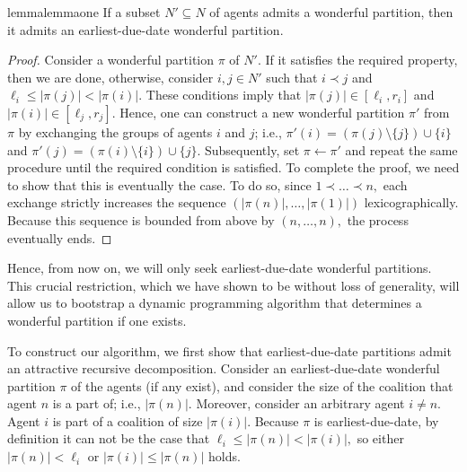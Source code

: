 \documentclass[a4paper,UKenglish,cleveref, autoref, thm-restate]{lipics-v2021}
\newcommand{\set}[1]{\{#1\}}
\newcommand{\modulus}[1]{\vert #1 \vert}
\begin{document}
\begin{restatable}{lemma}{lemmaone} If a subset $N' \subseteq N$ of agents admits a wonderful partition, then it admits an earliest-due-date wonderful partition. 
\end{restatable}
\begin{proof} Consider a wonderful partition $\pi$ of $N'.$ If it satisfies the required property, then we are done, otherwise, consider $i, j \in N'$ such that $i\prec j$ and $\ell_i \leq \modulus{\pi(j)} < \modulus{\pi(i)}.$ These conditions imply that $\modulus{\pi(j)} \in [\ell_i, r_i]$ and $\modulus{\pi(i)} \in [\ell_j, r_j].$ Hence, one can construct a new wonderful partition $\pi'$ from $\pi$ by exchanging the groups of agents $i$ and $j$; i.e., $\pi'(i) = (\pi(j) \setminus \set{j}) \cup \set{i}$ and $\pi'(j) = (\pi(i) \setminus \set{i}) \cup \set{j}.$ Subsequently, set $\pi \gets \pi'$ and repeat the same procedure until the required condition is satisfied. To complete the proof, we need to show that this is eventually the case. To do so, since $1 \prec \ldots \prec n,$ each exchange strictly increases the sequence $(\modulus{\pi(n)}, \ldots,\modulus{\pi(1)})$ lexicographically. Because this sequence is bounded from above by $(n, \ldots, n),$ the process eventually ends.
\end{proof}

\noindent Hence, from now on, we will only seek earliest-due-date wonderful partitions. This crucial restriction, which we have shown to be without loss of generality, will allow us to bootstrap a dynamic programming algorithm that determines a wonderful partition if one exists.

To construct our algorithm, we first show that earliest-due-date partitions admit an attractive recursive decomposition. 
Consider an earliest-due-date wonderful partition $\pi$ of the agents (if any exist), and consider the size of the coalition that agent $n$ is a part of; i.e., $\modulus{\pi(n)}.$ Moreover, consider an arbitrary agent $i \neq n.$ Agent $i$ is part of a coalition of size $\modulus{\pi(i)}.$ Because $\pi$ is earliest-due-date, by definition it can not be the case that $\ell_i \leq \modulus{\pi(n)} < \modulus{\pi(i)},$ so either $\modulus{\pi(n)} < \ell_i$ or $\modulus{\pi(i)} \leq \modulus{\pi(n)}$ holds.
\end{document}
